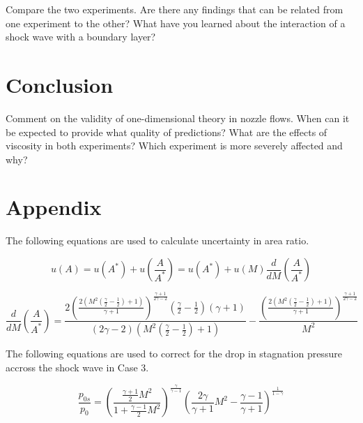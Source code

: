 \documentclass{article}
\begin{document}
Compare the two experiments. Are there any findings that can be related from one experiment to the other?
What have you learned about the interaction of a shock wave with a boundary layer?

\section{Conclusion}

Comment on the validity of one-dimensional theory in nozzle flows. When can it be expected to
provide what quality of predictions?
What are the effects of viscosity in both experiments? Which experiment is more severely affected
and why?

\newpage

\section{Appendix}

The following equations are used to calculate uncertainty in area ratio.

\begin{equation}
    u(A) = u(A^*) + u\left( \frac{A}{A^*} \right) = u(A^*) + u(M) \frac{d}{dM}\left( \frac{A}{A^*} \right)
\end{equation}

\begin{equation}
    \frac{d}{dM}\left( \frac{A}{A^*} \right) = \frac{2 \left(\frac{2 \left(M^{2} \left(\frac{\gamma}{2} - \frac{1}{2}\right) + 1\right)}{\gamma + 1}\right)^{\frac{\gamma + 1}{2 \gamma - 2}} \left(\frac{\gamma}{2} - \frac{1}{2}\right) \left(\gamma + 1\right)}{\left(2 \gamma - 2\right) \left(M^{2} \left(\frac{\gamma}{2} - \frac{1}{2}\right) + 1\right)} - \frac{\left(\frac{2 \left(M^{2} \left(\frac{\gamma}{2} - \frac{1}{2}\right) + 1\right)}{\gamma + 1}\right)^{\frac{\gamma + 1}{2 \gamma - 2}}}{M^{2}}
    \label{eqn:dA_dM}
\end{equation}

The following equations are used to correct for the drop in stagnation pressure accross the shock wave in Case 3.

\begin{equation}
    \frac{p_{0s}}{p_0} = \left( \frac{\frac{\gamma+1}{2}M^2}{1 + \frac{\gamma-1}{2}M^2}\right) ^ \frac{\gamma}{\gamma-1} \left( \frac{2\gamma}{\gamma+1} M^2 - \frac{\gamma-1}{\gamma+1}\right) ^ \frac{1}{1 - \gamma}
\end{equation}
\end{document}
